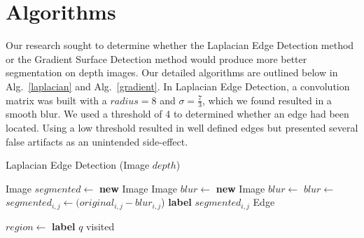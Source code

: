 
\section{Algorithms}
\label{sec:expts}

Our research sought to determine whether the Laplacian Edge Detection method or the Gradient Surface Detection method would produce more better segmentation on depth images. Our detailed algorithms are outlined below in Alg.~\ref{laplacian} and Alg.~\ref{gradient}. In Laplacian Edge Detection, a convolution matrix was built with a $radius = 8$ and $\sigma = \frac{7}{3}$, which we found resulted in a smooth blur. We used a threshold of 4 to determined whether an edge had been located. Using a low threshold resulted in well defined edges but presented several false artifacts as an unintended side-effect.

\begin{algorithm}
\caption{Laplacian Edge Detection (Image $depth$)}\label{laplacian}
\begin{algorithmic}[1]
\State Image $segmented \gets$ \textbf{new} Image
\State Image  $blur \gets$ \textbf{new} Image
\State $blur \gets $ 
\State $blur \gets $ 
\State $segmented_{i, j} \gets (original_{i, j}-blur_{i, j}$)
\State \textbf{label} $segmented_{i,j}$ Edge
\EndIf
\EndFor
\item[]
\State $region \gets$  
\State \textbf{label} $q$ visited
\EndFor
\EndIf
\EndFor
\State {}
\end{algorithmic}
\end{algorithm}

